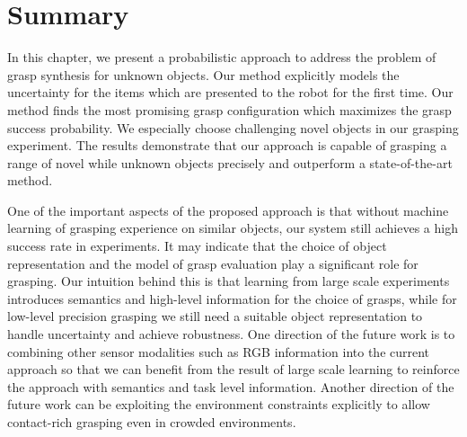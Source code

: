 \section{Summary}
In this chapter, we present a probabilistic approach to address the problem of grasp synthesis for unknown objects. Our method explicitly models the uncertainty for the items which are presented to the robot for the first time. Our method finds the most promising grasp configuration which maximizes the grasp success probability. We especially choose challenging novel objects in our grasping experiment. The results demonstrate that our approach is capable of grasping a range of novel while unknown objects precisely and outperform a state-of-the-art method.

One of the important aspects of the proposed approach is that without   machine learning of grasping experience on similar objects, our system still achieves a high success rate in experiments. It may indicate that the choice of object representation and the model of grasp evaluation play a significant role for grasping. Our intuition behind this is that learning from large scale experiments introduces semantics and high-level information for the choice of grasps, while for low-level precision grasping we still need a suitable object representation to handle uncertainty and achieve robustness. One direction of the future work is to combining other sensor modalities such as RGB information into the current approach so that we can benefit from
 the result of large scale learning to reinforce the approach with semantics and task level information. Another direction of the future work can be exploiting the environment constraints explicitly to allow contact-rich grasping even in crowded environments.




